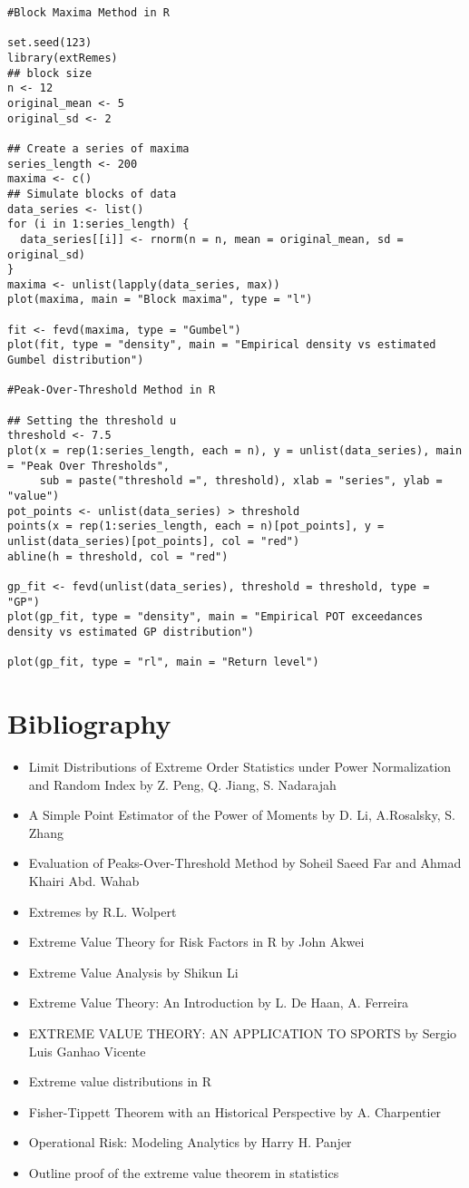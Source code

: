 \documentclass[11pt,a4paper]{article}
\theoremstyle{plain}
\begin{document}
\begin{verbatim}
#Block Maxima Method in R

set.seed(123)
library(extRemes)
## block size
n <- 12
original_mean <- 5
original_sd <- 2

## Create a series of maxima
series_length <- 200
maxima <- c()
## Simulate blocks of data
data_series <- list()
for (i in 1:series_length) {
  data_series[[i]] <- rnorm(n = n, mean = original_mean, sd = original_sd)
}
maxima <- unlist(lapply(data_series, max))
plot(maxima, main = "Block maxima", type = "l")

fit <- fevd(maxima, type = "Gumbel")
plot(fit, type = "density", main = "Empirical density vs estimated Gumbel distribution")

#Peak-Over-Threshold Method in R

## Setting the threshold u
threshold <- 7.5
plot(x = rep(1:series_length, each = n), y = unlist(data_series), main = "Peak Over Thresholds",
     sub = paste("threshold =", threshold), xlab = "series", ylab = "value")
pot_points <- unlist(data_series) > threshold
points(x = rep(1:series_length, each = n)[pot_points], y = unlist(data_series)[pot_points], col = "red")
abline(h = threshold, col = "red")

gp_fit <- fevd(unlist(data_series), threshold = threshold, type = "GP")
plot(gp_fit, type = "density", main = "Empirical POT exceedances density vs estimated GP distribution")

plot(gp_fit, type = "rl", main = "Return level")
\end{verbatim}



\newpage
\section{Bibliography}

\begin{itemize}
  \item Limit Distributions of Extreme Order Statistics under Power Normalization and Random Index by Z. Peng, Q. Jiang, S. Nadarajah
  \item A Simple Point Estimator of the Power of Moments by D. Li, A.Rosalsky, S. Zhang 
  \item Evaluation of Peaks-Over-Threshold Method by Soheil Saeed Far and Ahmad Khairi Abd. Wahab
  \item Extremes by R.L. Wolpert
  \item Extreme Value Theory for Risk Factors in R by John Akwei
  \item Extreme Value Analysis by Shikun Li
  \item Extreme Value Theory: An Introduction by L. De Haan, A. Ferreira
  \item EXTREME VALUE THEORY: AN APPLICATION TO SPORTS by Sergio Luis Ganhao Vicente
  \item Extreme value distributions in R
  \item Fisher-Tippett Theorem with an Historical Perspective by A. Charpentier
  \item Operational Risk: Modeling Analytics by Harry H. Panjer
  \item Outline proof of the extreme value theorem in statistics
\end{itemize}
\end{document}
